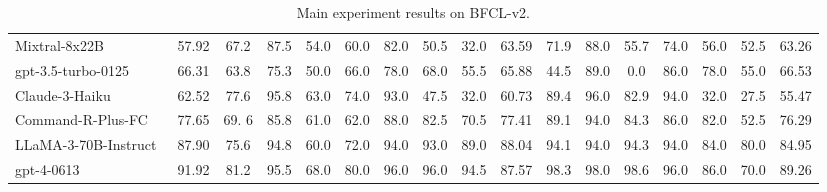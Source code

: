 \begin{table*}[h]
\begin{tabular}{@{}lcc>{}ccccccc>{}cccccc>{}c@{}}
Mixtral-8x22B~\cite{jiang2024mixtral} & 57.92 & 67.2 & 87.5 & 54.0 & 60.0 & 82.0 & 50.5 & 32.0 & 63.59 & 71.9 & 88.0 & 55.7 & 74.0 & 56.0 & 52.5 & 63.26\\
gpt-3.5-turbo-0125~\cite{chatgpt} & 66.31 & 63.8 & 75.3 & 50.0 & 66.0 & 78.0 & 68.0 & 55.5 & 65.88 & 44.5 & 89.0 & 0.0 & 86.0 & 78.0 & 55.0  & 66.53 \\
Claude-3-Haiku~\cite{claude-3} & 62.52 & 77.6 & 95.8 & 63.0 & 74.0 & 93.0 & 47.5 & 32.0 & 60.73 & 89.4& 96.0 & 82.9 & 94.0 & 32.0 & 27.5 & 55.47 \\
Command-R-Plus-FC~\cite{command-r-plus} & 77.65 & 69. 6 & 85.8 & 61.0 & 62.0 & 88.0 & 82.5 & 70.5 & 77.41 & 89.1 & 94.0 & 84.3 & 86.0 & 82.0 & 52.5 & 76.29\\
LLaMA-3-70B-Instruct~\cite{dubey2024llama} & 87.90 & 75.6 & 94.8 & 60.0 & 72.0 & 94.0 & 93.0 &89.0 & 88.04 & 94.1 & 94.0 & 94.3 & 94.0 & 84.0 & 80.0  & 84.95\\
gpt-4-0613~\cite{achiam2023gpt} & 91.92 & 81.2 & 95.5 & 68.0 & 80.0 & 96.0 & 96.0 & 94.5 & 87.57 & 98.3 & 98.0 & 98.6 & 96.0 & 86.0 & 70.0 & {89.26} \\\bottomrule
\end{tabular}
\caption{Main experiment results on BFCL-v2. 
}\label{tab:bfcl-v2}
\end{table*}